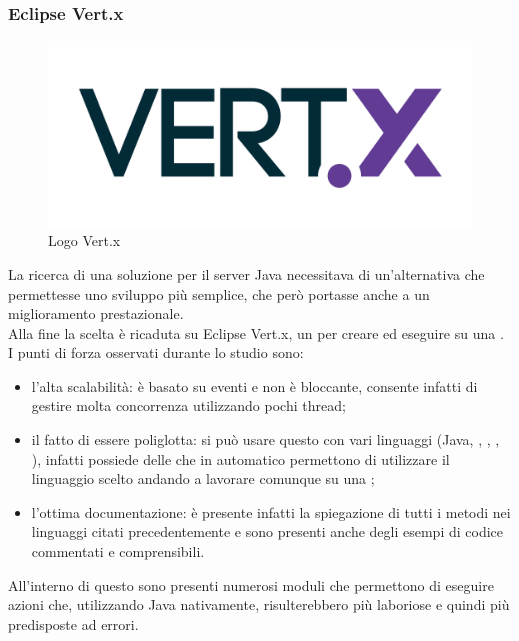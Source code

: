       \subsubsection{Eclipse Vert.x}
        \begin{figure}[h]
          \centering
          \includegraphics[scale=0.1]{immagini/Vertx.png}
          \caption{Logo Vert.x}
          \label{logoVertx}
        \end{figure}
        La ricerca di una soluzione per il server Java necessitava di un'alternativa che permettesse uno sviluppo più semplice, che però portasse anche a un miglioramento prestazionale.\\
        Alla fine la scelta è ricaduta su Eclipse Vert.x, un  per creare ed eseguire  su una .\\
        I punti di forza osservati durante lo studio sono:
        \begin{itemize}
          \item l'alta scalabilità: è basato su eventi e non è bloccante, consente infatti di gestire molta concorrenza utilizzando pochi thread;
          \item il fatto di essere poliglotta: si può usare questo  con vari linguaggi (Java, , , , ), infatti possiede delle  che in automatico permettono di utilizzare il linguaggio scelto andando a lavorare comunque su una ;
          \item l'ottima documentazione: è presente infatti la spiegazione di tutti i metodi nei linguaggi citati precedentemente e sono presenti anche degli esempi di codice commentati e comprensibili.
        \end{itemize}
        All'interno di questo  sono presenti numerosi moduli che permettono di eseguire azioni che, utilizzando Java nativamente, risulterebbero più laboriose e quindi più predisposte ad errori.\\
